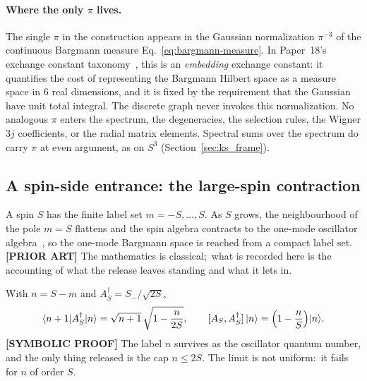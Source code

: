 \documentclass[twocolumn,pra,amsmath,amssymb,superscriptaddress]{revtex4-2}
\begin{document}
\paragraph{Where the only $\pi$ lives.}
The single $\pi$ in the construction appears in the Gaussian
normalization $\pi^{-3}$ of the continuous Bargmann measure
Eq.~\eqref{eq:bargmann-measure}.  In Paper~18's exchange constant
taxonomy~\cite{paper18}, this is an \emph{embedding} exchange
constant: it quantifies the cost of representing the Bargmann
Hilbert space as a measure space in $6$ real dimensions, and it is
fixed by the requirement that the Gaussian have unit total integral.
The discrete graph never invokes this normalization.  No analogous
$\pi$ enters the spectrum, the degeneracies, the selection rules,
the Wigner $3j$ coefficients, or the radial matrix elements.
Spectral sums over the spectrum do carry $\pi$ at even argument, as on
$S^3$ (Section~\ref{sec:ks_frame}).

\subsection{A spin-side entrance: the large-spin contraction}
\label{sec:large_spin}

A spin $S$ has the finite label set $m = -S, \dots, S$.  As $S$
grows, the neighbourhood of the pole $m = S$ flattens and the spin
algebra contracts to the one-mode oscillator
algebra~\cite{holstein1940,inonu1953}, so the one-mode Bargmann space
is reached from a compact label set.  \textbf{[PRIOR ART]} The
mathematics is classical;\ what is recorded here is the accounting of
what the release leaves standing and what it lets in.

With $n = S - m$ and $A_S^\dagger = S_-/\sqrt{2S}$,
\begin{equation}
  \langle n+1 | A_S^\dagger | n \rangle
  = \sqrt{n+1}\,\sqrt{1 - \frac{n}{2S}},
  \qquad
  [A_S, A_S^\dagger]\,|n\rangle = \Bigl(1 - \frac{n}{S}\Bigr)|n\rangle .
  \label{eq:hp_contraction}
\end{equation}
\textbf{[SYMBOLIC PROOF]} The label $n$ survives as the oscillator
quantum number, and the only thing released is the cap $n \le 2S$.
The limit is not uniform:\ it fails for $n$ of order $S$.
\end{document}
